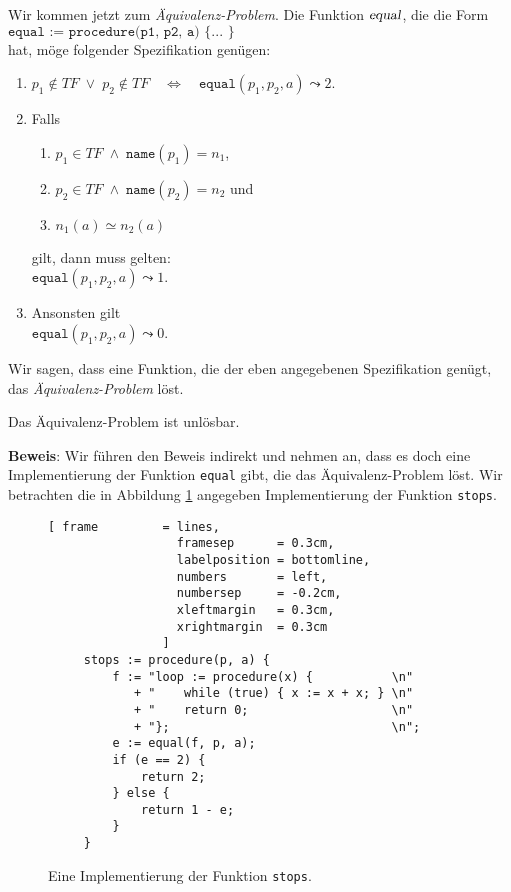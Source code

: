 \noindent
Wir kommen jetzt zum \emph{Äquivalenz-Problem}.  Die Funktion $\textsl{equal}$, die die Form
\\[0.2cm]
\hspace*{1.3cm}
$\texttt{equal := procedure(p1, p2, a) \{ ... \}}$
\\[0.2cm]
hat, m\"oge folgender Spezifikation gen\"ugen:
\begin{enumerate}
\item $p_1 \not\in T\!F \;\vee\; p_2 \not\in T\!F \quad\Leftrightarrow\quad \mathtt{equal}(p_1, p_2, a) \leadsto 2$.
\item Falls 
  \begin{enumerate}
  \item $p_1 \in T\!F \;\wedge\; \mathtt{name}(p_1) = n_1$,
  \item $p_2 \in T\!F \;\wedge\; \mathtt{name}(p_2) = n_2$ \quad und
  \item $n_1(a) \simeq n_2(a)$
  \end{enumerate}
    gilt, dann muss gelten: \\[0.1cm]
   \hspace*{1.3cm}  $\mathtt{equal}(p_1, p_2, a) \leadsto 1$.
\item Ansonsten gilt \\[0.1cm]
      \hspace*{1.3cm} $\mathtt{equal}(p_1, p_2, a) \leadsto 0$.
\end{enumerate}
Wir sagen, dass eine Funktion, die der eben angegebenen Spezifikation gen\"ugt, das
\emph{Äquivalenz-Problem} l\"ost.

\begin{Theorem}[Rice, 1953]
Das Äquivalenz-Problem ist unl\"osbar.  
\end{Theorem}

\noindent
\textbf{Beweis}:
Wir f\"uhren den Beweis indirekt und nehmen
an, dass es doch eine Implementierung der Funktion \texttt{equal} gibt, die das
Äquivalenz-Problem l\"ost.  Wir betrachten die in Abbildung 
\ref{fig:stops} angegeben Implementierung der Funktion \texttt{stops}.


\begin{figure}[!h]
  \centering
\begin{Verbatim}[ frame         = lines, 
                  framesep      = 0.3cm, 
                  labelposition = bottomline,
                  numbers       = left,
                  numbersep     = -0.2cm,
                  xleftmargin   = 0.3cm,
                  xrightmargin  = 0.3cm
                ]
     stops := procedure(p, a) {
         f := "loop := procedure(x) {           \n"
            + "    while (true) { x := x + x; } \n"
            + "    return 0;                    \n"
            + "};                               \n";                 
         e := equal(f, p, a);
         if (e == 2) {
             return 2;
         } else {
             return 1 - e;
         }
     }
\end{Verbatim}
  \vspace*{-0.3cm}
  \caption{Eine Implementierung der Funktion \texttt{stops}.}
  \label{fig:stops}
\end{figure}

